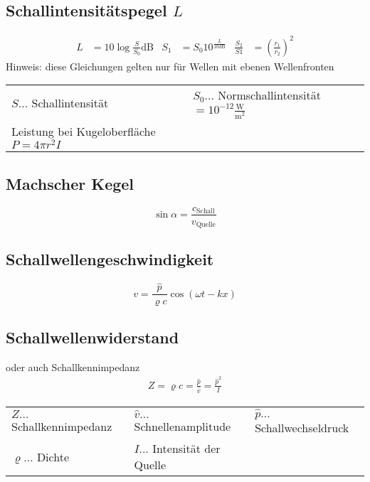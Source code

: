 		\subsection{Schallintensitätspegel $L$}
			\begin{align*}
				L &= 10 \log{\frac{S}{S_0}}\mathrm{dB}  & S_1 &= S_0 10^{\frac{L}{10\mathrm{dB}}} & \frac{S_2}{S1} &= \left(\frac{r_1}{r_2} \right)^2
			\end{align*}
			Hinweis: diese Gleichungen gelten nur für Wellen mit ebenen Wellenfronten\newline

			\begin{table}[h]
			\begin{tabular}{ll}
			$S\dots$ Schallintensität & $S_0\dots$ Normschallintensität $=10^{-12}\frac{\mathrm{W}}{\mathrm{m}^2}$\\
			Leistung bei Kugeloberfläche $ P = 4\pi r^2I$
			\end{tabular}
			\end{table}

		\subsection{Machscher Kegel}
			\[ \sin \alpha = \frac{c_{\mathrm{Schall}}}{v_{\mathrm{Quelle}}}\] 
			
		\subsection{Schallwellengeschwindigkeit}
			\[ v = \frac{\hat{p}}{\varrho c}\cos(\omega t - kx) \]
		
		\subsection{Schallwellenwiderstand}
			oder auch Schallkennimpedanz
			\begin{align*}
				Z = \varrho c = \frac{\hat{p}}{\hat{v}} = \frac{\hat{p}^2}{I}
			\end{align*}
			
			\begin{table}[h]
			\begin{tabular}{lll}
			$Z\dots$ Schallkennimpedanz & $\hat{v}\dots$ Schnellenamplitude & $\hat{p}\dots$ Schallwechseldruck\\
			$\varrho\dots$ Dichte & $I\dots$ Intensität der Quelle\\
			\end{tabular}
			\end{table}

